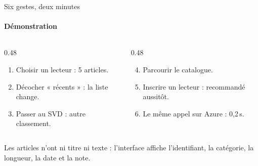 \documentclass[aspectratio=169, 12pt, t]{beamer}
\newcommand{\aretenir}[1]{%
  \vfill
  \begin{tcolorbox}[enhanced, colback=surf, colframe=surf, boxrule=0pt, arc=2mm, left=3.5mm, right=3mm,
      top=1.6mm, bottom=1.6mm, borderline west={2pt}{0pt}{signal}]
    \small #1
  \end{tcolorbox}}
\begin{document}
\begin{frame}{Six gestes, deux minutes}
  \framesubtitle{Démonstration}
  \begin{columns}[T]
    \begin{column}{0.48\textwidth}
      \begin{enumerate}\itemsep6pt
        \item Choisir un lecteur : 5 articles.
        \item Décocher « récents » : la liste change.
        \item Passer au SVD : autre classement.
      \end{enumerate}
    \end{column}
    \begin{column}{0.48\textwidth}
      \begin{enumerate}\setcounter{enumi}{3}\itemsep6pt
        \item Parcourir le catalogue.
        \item Inscrire un lecteur : recommandé aussitôt.
        \item Le même appel sur Azure : 0,2\,s.
      \end{enumerate}
    \end{column}
  \end{columns}
  \aretenir{Les articles n'ont ni titre ni texte : l'interface affiche l'identifiant, la catégorie, la longueur, la date et la note.}
\end{frame}
\end{document}
